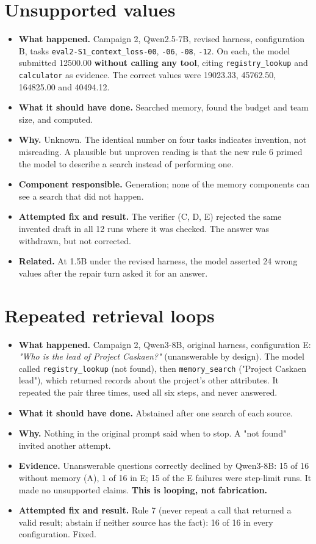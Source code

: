 \documentclass[10.5pt,a4paper,oneside]{report}
\begin{document}
\section{Unsupported values}
\begin{itemize}
\item \textbf{What happened.} Campaign 2, Qwen2.5-7B, revised harness, configuration B, tasks \texttt{eval2-S1\_\allowbreak{}context\_\allowbreak{}loss-00}, \texttt{-06}, \texttt{-08}, \texttt{-12}. On each, the model submitted 12500.00 \textbf{without calling any tool}, citing \texttt{registry\_\allowbreak{}lookup} and \texttt{calculator} as evidence. The correct values were 19023.33, 45762.50, 164825.00 and 40494.12.
\item \textbf{What it should have done.} Searched memory, found the budget and team size, and computed.
\item \textbf{Why.} Unknown. The identical number on four tasks indicates invention, not misreading. A plausible but unproven reading is that the new rule 6 primed the model to describe a search instead of performing one.
\item \textbf{Component responsible.} Generation; none of the memory components can see a search that did not happen.
\item \textbf{Attempted fix and result.} The verifier (C, D, E) rejected the same invented draft in all 12 runs where it was checked. The answer was withdrawn, but not corrected.
\item \textbf{Related.} At 1.5B under the revised harness, the model asserted 24 wrong values after the repair turn asked it for an answer.
\end{itemize}
\section{Repeated retrieval loops}
\begin{itemize}
\item \textbf{What happened.} Campaign 2, Qwen3-8B, original harness, configuration E: \emph{"Who is the lead of Project Caskaen?"} (unanswerable by design). The model called \texttt{registry\_\allowbreak{}lookup} (not found), then \texttt{memory\_\allowbreak{}search} ("Project Caskaen lead"), which returned records about the project's other attributes. It repeated the pair three times, used all six steps, and never answered.
\item \textbf{What it should have done.} Abstained after one search of each source.
\item \textbf{Why.} Nothing in the original prompt said when to stop. A "not found" invited another attempt.
\item \textbf{Evidence.} Unanswerable questions correctly declined by Qwen3-8B: 15 of 16 without memory (A), 1 of 16 in E; 15 of the E failures were step-limit runs. It made no unsupported claims. \textbf{This is looping, not fabrication.}
\item \textbf{Attempted fix and result.} Rule 7 (never repeat a call that returned a valid result; abstain if neither source has the fact): 16 of 16 in every configuration. Fixed.
\end{itemize}
\end{document}
